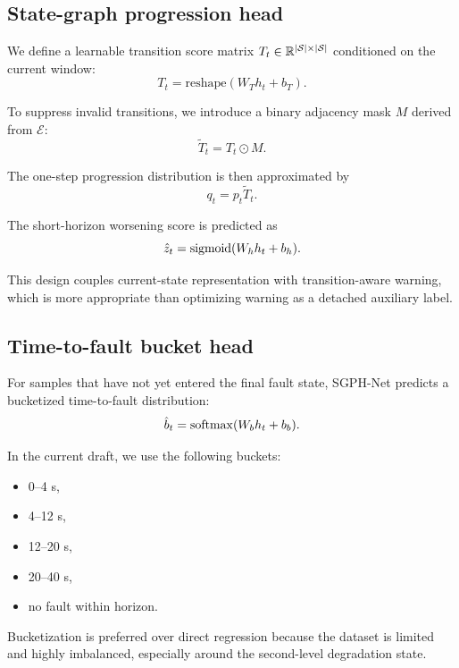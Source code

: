 \subsection{State-graph progression head}

We define a learnable transition score matrix $T_t \in \mathbb{R}^{|\mathcal{S}| \times |\mathcal{S}|}$ conditioned on the current window:
\begin{equation}
T_t = \mathrm{reshape}(W_T h_t + b_T).
\end{equation}

To suppress invalid transitions, we introduce a binary adjacency mask $M$ derived from $\mathcal{E}$:
\begin{equation}
\tilde{T}_t = T_t \odot M.
\end{equation}

The one-step progression distribution is then approximated by
\begin{equation}
q_t = p_t \tilde{T}_t.
\end{equation}

The short-horizon worsening score is predicted as
\begin{equation}
\hat{z}_t = \mathrm{sigmoid}(W_h h_t + b_h).
\end{equation}

This design couples current-state representation with transition-aware warning, which is more appropriate than optimizing warning as a detached auxiliary label.

\subsection{Time-to-fault bucket head}

For samples that have not yet entered the final fault state, SGPH-Net predicts a bucketized time-to-fault distribution:
\begin{equation}
\hat{b}_t = \mathrm{softmax}(W_b h_t + b_b).
\end{equation}

In the current draft, we use the following buckets:
\begin{itemize}
\item 0--4 s,
\item 4--12 s,
\item 12--20 s,
\item 20--40 s,
\item no fault within horizon.
\end{itemize}

Bucketization is preferred over direct regression because the dataset is limited and highly imbalanced, especially around the second-level degradation state.

